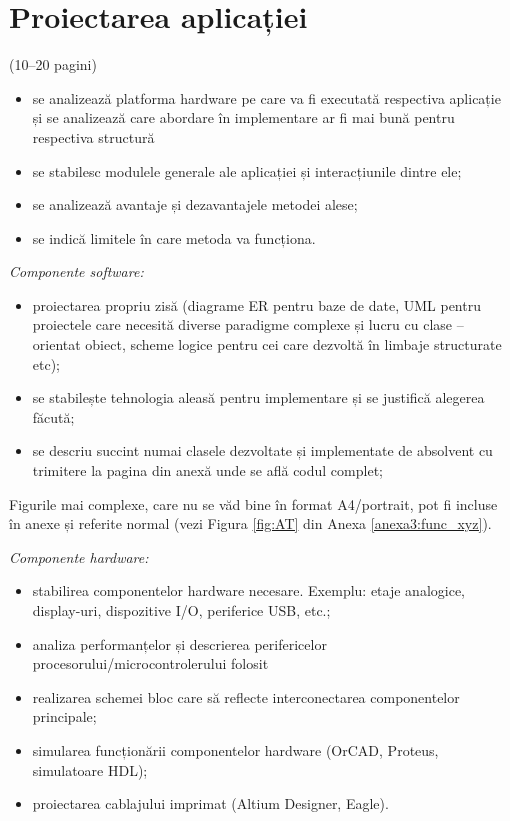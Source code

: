 \iffalse
\chapter{Proiectarea aplicației}
\label{cap:cap2}

(10–20 pagini)

\begin{itemize}
    \item se analizează platforma hardware pe care va fi executată respectiva aplicație și se analizează care abordare în implementare ar fi mai bună pentru respectiva structură
    \item se stabilesc modulele generale ale aplicației și interacțiunile dintre ele;
    \item se analizează avantaje și dezavantajele metodei alese;
    \item se indică limitele în care metoda va funcționa. 
\end{itemize}

\textit{Componente software:}
\begin{itemize}
    \item proiectarea propriu zisă (diagrame ER pentru baze de date, UML pentru proiectele care necesită diverse paradigme complexe și lucru cu clase – orientat obiect, scheme logice pentru cei care dezvoltă în limbaje structurate etc);
    \item se stabilește tehnologia aleasă pentru implementare și se justifică alegerea făcută;
    \item se descriu succint numai clasele dezvoltate și implementate de absolvent cu trimitere la pagina din anexă unde se află codul complet;
\end{itemize}

Figurile mai complexe, care nu se văd bine în format A4/portrait, pot fi incluse în anexe și referite normal (vezi Figura \ref{fig:AT} din Anexa \ref{anexa3:func_xyz}).

\vspace{1em}

\textit{Componente hardware:}
\begin{itemize}
    \item stabilirea componentelor hardware necesare. Exemplu: etaje analogice, display-uri, dispozitive I/O, periferice USB, etc.;
    \item analiza performanțelor și descrierea perifericelor procesorului/microcontrolerului folosit
    \item realizarea schemei bloc care să reflecte interconectarea componentelor principale;
    \item simularea funcționării componentelor hardware (OrCAD, Proteus, simulatoare HDL);
    \item proiectarea cablajului imprimat (Altium Designer, Eagle).
\end{itemize}

